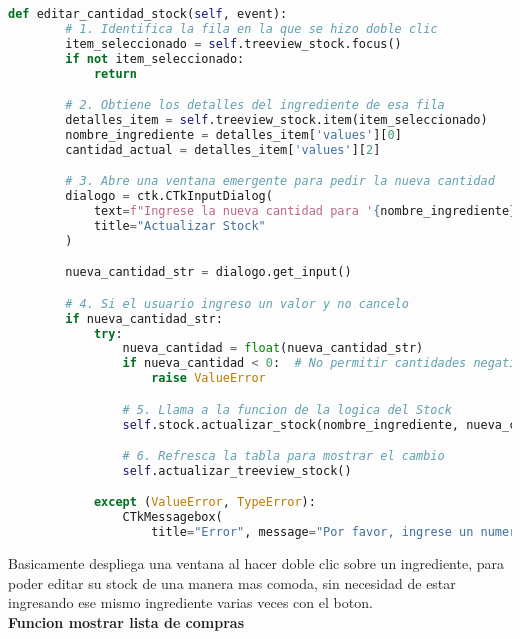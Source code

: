 \documentclass[a4paper,12pt]{article}
\begin{document}
\begin{lstlisting}[language=Python, caption={Nuevo codigo}, frame=single]
    def editar_cantidad_stock(self, event):
        # 1. Identifica la fila en la que se hizo doble clic
        item_seleccionado = self.treeview_stock.focus()
        if not item_seleccionado:
            return

        # 2. Obtiene los detalles del ingrediente de esa fila
        detalles_item = self.treeview_stock.item(item_seleccionado)
        nombre_ingrediente = detalles_item['values'][0]
        cantidad_actual = detalles_item['values'][2]

        # 3. Abre una ventana emergente para pedir la nueva cantidad
        dialogo = ctk.CTkInputDialog(
            text=f"Ingrese la nueva cantidad para '{nombre_ingrediente}':",
            title="Actualizar Stock"
        )

        nueva_cantidad_str = dialogo.get_input()

        # 4. Si el usuario ingreso un valor y no cancelo
        if nueva_cantidad_str:
            try:
                nueva_cantidad = float(nueva_cantidad_str)
                if nueva_cantidad < 0:  # No permitir cantidades negativas
                    raise ValueError

                # 5. Llama a la funcion de la logica del Stock
                self.stock.actualizar_stock(nombre_ingrediente, nueva_cantidad)

                # 6. Refresca la tabla para mostrar el cambio
                self.actualizar_treeview_stock()

            except (ValueError, TypeError):
                CTkMessagebox(
                    title="Error", message="Por favor, ingrese un numero valido y positivo.", icon="cancel")
\end{lstlisting}

Basicamente despliega una ventana al hacer doble clic sobre un ingrediente, para poder editar su stock de una manera mas comoda, sin necesidad de estar ingresando ese mismo ingrediente varias veces con el boton.\\

\textbf{Funcion mostrar lista de compras}\\
\end{document}
